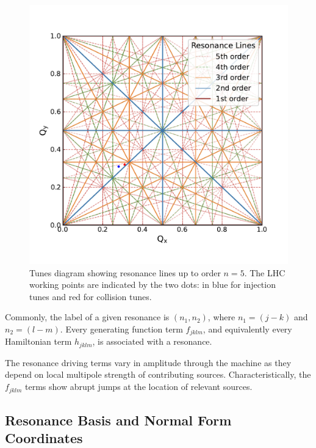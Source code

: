 \begin{figure}[!htb]
    \begin{center}
    \includegraphics[width = 0.9\linewidth]{Figures/Beam_Dynamics_Theory/tune_diagram_fifth_order_with_working_points.pdf}
    \caption{Tunes diagram showing resonance lines up to order \(n = 5\). The LHC working points are indicated by the two dots: in \textcolor{wpblue}{blue} for injection tunes and \textcolor{wpred}{red} for collision tunes.}
    \label{figure:tune_diagram_fifth_order}
    \end{center}
\end{figure}

Commonly, the label of a given resonance is \(\left( n_1, n_2 \right)\), where \(n_1 = \left( j - k \right)\) and \(n_2 = \left( l - m \right)\).
Every generating function term \(f_{jklm}\), and equivalently every Hamiltonian term \(h_{jklm}\), is associated with a resonance.

The resonance driving terms vary in amplitude through the machine as they depend on local multipole strength of contributing sources.
Characteristically, the \(f_{jklm}\) terms show abrupt jumps at the location of relevant sources.


\subsection{Resonance Basis and Normal Form Coordinates}

